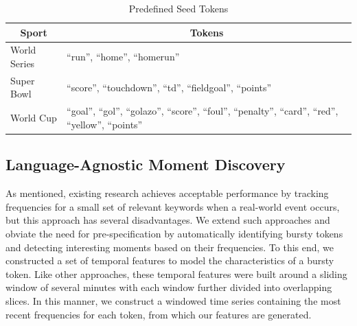 \documentclass{sig-alternate}
\begin{document}
%
\begin{table}[htdp]
\caption{Predefined Seed Tokens}
\begin{center}
\begin{tabular}{|p{0.7in}|p{2.0in}|}
\hline
\multicolumn{1}{|c|}{\textbf{Sport}} & \multicolumn{1}{|c|}{\textbf{Tokens}} \\ \hline
World Series & ``run'', ``home'', ``homerun'' \\ \hline
Super Bowl & ``score'', ``touchdown'', ``td'', ``fieldgoal'', ``points'' \\ \hline
World Cup & ``goal'', ``gol'', ``golazo'', ``score'', ``foul'', ``penalty'', ``card'', ``red'', ``yellow'', ``points'' \\ \hline
\end{tabular}
\end{center}
\label{tab:targetTokens}
\end{table}

\subsection{Language-Agnostic Moment Discovery}

As mentioned, existing research achieves acceptable performance by tracking frequencies for a small set of relevant keywords when a real-world event occurs, but this approach has several disadvantages.
We extend such approaches and obviate the need for pre-specification by automatically identifying bursty tokens and detecting interesting moments based on their frequencies.
To this end, we constructed a set of temporal features to model the characteristics of a bursty token.
Like other approaches, these temporal features were built around a sliding window of several minutes with each window further divided into overlapping slices. %
In this manner, we construct a windowed time series containing the most recent frequencies for each token, from which our features are generated.

\end{document}
